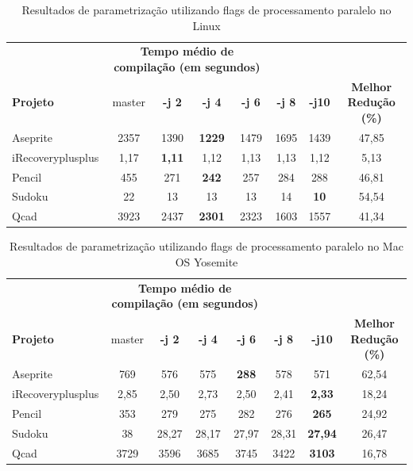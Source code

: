 \begin{table}[!ht]
\tiny
\centering
\caption{Resultados de parametrização utilizando flags de processamento paralelo no Linux}
\label{tab:flags_processamento_paralelo:linux}
\begin{tabular}{lccccccc}
& \multicolumn{4}{c}{\textbf{Tempo médio de compilação (em segundos)} } \\
\textbf{Projeto} & master & \textbf{-j 2} & \textbf{-j 4} & \textbf{-j 6} & \textbf{-j 8} & \textbf{-j10} &  \textbf{Melhor Redução (\%)} \\ \toprule
Aseprite & 2357 & 1390 & \textbf{1229} & 1479 & 1695 & 1439 & 47,85  \\ 
iRecoveryplusplus & 1,17 & \textbf{1,11} &  1,12 & 1,13 & 1,13 & 1,12 & 5,13 \\ 
Pencil & 455 & 271 & \textbf{242} & 257 & 284 & 288 &  46,81 \\ 
Sudoku & 22 & 13 & 13 & 13 & 14 & \textbf{10} & 54,54  \\ 
Qcad & 3923 & 2437 & \textbf{2301} & 2323 & 1603 & 1557 & 41,34 \\ 
\end{tabular}
\end{table}


\begin{table}[!ht]
\tiny
\centering
\caption{Resultados de parametrização utilizando flags de processamento paralelo no Mac OS Yosemite}
\label{tab:flags_processamento_paralelo:mac_os}
\begin{tabular}{lccccccc}
& \multicolumn{4}{c}{\textbf{Tempo médio de compilação (em segundos)} } \\
\textbf{Projeto} &  master & \textbf{-j 2} & \textbf{-j 4} & \textbf{-j 6} & \textbf{-j 8} & \textbf{-j10} &  \textbf{Melhor Redução (\%)} \\ \toprule
Aseprite  & 769 & 576 & 575 & \textbf{288} & 578 & 571 &  62,54 \\ 
iRecoveryplusplus & 2,85 & 2,50 & 2,73 &  2,50 &  2,41 &  \textbf{2,33} & 18,24\\ 
Pencil & 353  & 279 & 275 & 282 & 276 & \textbf{265} & 24,92 \\ 
Sudoku &  38   & 28,27 & 28,17 & 27,97 & 28,31 & \textbf{27,94} & 26,47 \\ 
Qcad   & 3729  & 3596 & 3685 & 3745 & 3422 & \textbf{3103}  & 16,78 \\ 
\end{tabular}
\end{table}

